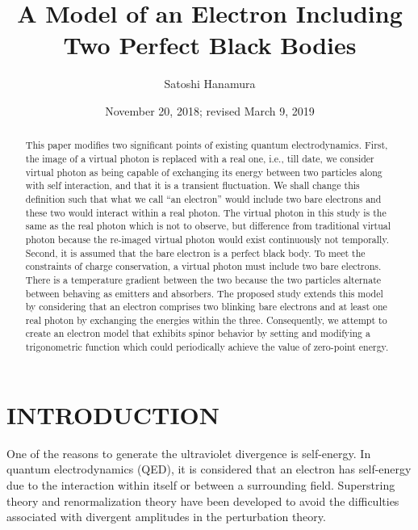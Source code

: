 \documentclass[%
 reprint,
 amsmath,amssymb,
 aps,
]{revtex4-1}
\numberwithin{equation}{section}%
\begin{document}


    \title{A Model of an Electron Including Two Perfect Black Bodies}
    \author{Satoshi Hanamura}
\date{November 20, 2018; revised March 9, 2019}
        \begin{abstract}
            This paper modifies two significant points of existing quantum electrodynamics. First, the image of a virtual photon is replaced with a real one, i.e., till date, we consider virtual photon as being capable of exchanging its energy between two particles along with self interaction, and that it is a transient fluctuation. We shall change this definition such that what we call ``an electron'' would include two bare electrons and these two would interact within a real photon. The virtual photon in this study is the same as the real photon which is not to observe, but difference from traditional virtual photon because the re-imaged virtual photon would exist continuously not temporally. Second, it is assumed that the bare electron is a perfect black body. To meet the constraints of charge conservation, a virtual photon must include two bare electrons. There is a temperature gradient between the two because the two particles alternate between behaving as emitters and absorbers. The proposed study extends this model by considering that an electron comprises two blinking bare electrons and at least one real photon by exchanging the energies within the three. Consequently, we attempt to create an electron model that exhibits spinor behavior by setting and modifying a trigonometric function which could periodically achieve the value of zero-point energy.
        \end{abstract}
    \maketitle


\section{\label{sec:INTRODUCTION}INTRODUCTION}


    One of the reasons to generate the ultraviolet divergence is self-energy. In quantum electrodynamics (QED),  it is considered that an electron has self-energy due to the interaction within itself or between a surrounding field. Superstring theory and renormalization theory have been developed to avoid the difficulties associated with divergent amplitudes in the perturbation theory.
\end{document}
